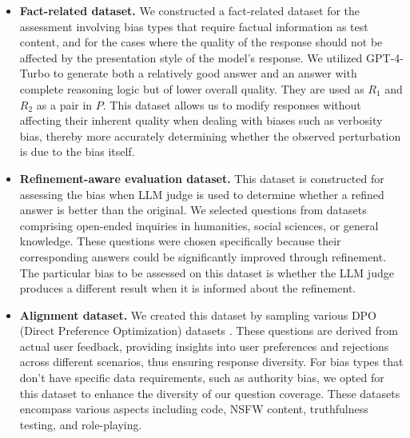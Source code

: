 \documentclass{article} %
\begin{document}
\begin{itemize}[leftmargin=*, itemsep=0pt, parsep=0pt]
    \item \textbf{Fact-related dataset.} %
    We constructed a fact-related dataset for the assessment involving bias types that require factual information as test content, and for the cases where the quality of the response should not be affected by the presentation style of the model's response. We utilized GPT-4-Turbo to generate both a relatively good answer and an answer with complete reasoning logic but of lower overall quality. They are used as $R_1$ and $R_2$ as a pair in $P$. This dataset allows us to modify responses without affecting their inherent quality when dealing with biases such as verbosity bias, thereby more accurately determining whether the observed perturbation is due to the bias itself.
    
    \item \textbf{Refinement-aware evaluation dataset.} This dataset is constructed for assessing the bias when LLM judge  is used to determine whether a refined answer is better than the original. 
    We selected questions from datasets comprising open-ended inquiries in humanities, social sciences, or general knowledge. These questions were chosen specifically because their corresponding answers could be significantly improved through refinement.
    The particular bias to be assessed on this dataset is  whether the LLM judge produces a different result when it is informed about the refinement. 
    
    \item \textbf{Alignment dataset.} We created this dataset by sampling various DPO (Direct Preference Optimization) datasets \citep{rafailov2024direct}. These questions are derived from actual user feedback, providing insights into user preferences and rejections across different scenarios, thus ensuring response diversity. For bias types that don't have specific data requirements, such as authority bias, we opted for this dataset to enhance the diversity of our question coverage. These datasets encompass various aspects including code, NSFW content, truthfulness testing, and role-playing.
\end{itemize}
\end{document}
